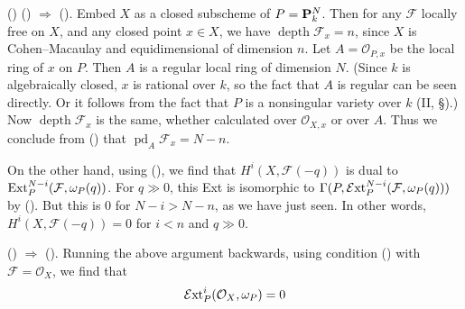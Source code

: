 {() () $\Rightarrow$ (). Embed $X$ as a closed subscheme of $P=\mathbf{P}_k^N$. Then for any $\mathcal F$ locally free on $X$, and any closed point $x\in X$, we have $\operatorname{depth}\mathcal F_x=n$, since $X$ is Cohen--Macaulay and equidimensional of dimension $n$. Let $A=\mathcal O_{P,x}$ be the local ring of $x$ on $P$. Then $A$ is a regular local ring of dimension $N$. (Since $k$ is algebraically closed, $x$ is rational over $k$, so the fact that $A$ is regular can be seen directly. Or it follows from the fact that $P$ is a nonsingular variety over $k$ (II, \S{}).) Now $\operatorname{depth}\mathcal F_x$ is the same, whether calculated over $\mathcal O_{X,x}$ or over $A$. Thus we conclude from () that $\operatorname{pd}_A\mathcal F_x=N-n$.

On the other hand, using (), we find that $H^i(X,\mathcal F(-q))$ is dual to $\operatorname{Ext}_P^{N-i}(\mathcal F,\omega_P(q))$. For $q\gg0$, this Ext is isomorphic to $\Gamma(P,\operatorname{\mathcal E xt}_P^{N-i}(\mathcal F,\omega_P(q)))$ by (). But this is $0$ for $N-i>N-n$, as we have just seen. In other words, $H^i(X,\mathcal F(-q))=0$ for $i<n$ and $q\gg0$.

() $\Rightarrow$ (). Running the above argument backwards, using condition () with $\mathcal F=\mathcal O_X$, we find that
\[
\operatorname{\mathcal E xt}_P^i(\mathcal O_X,\omega_P)=0
\]
}
